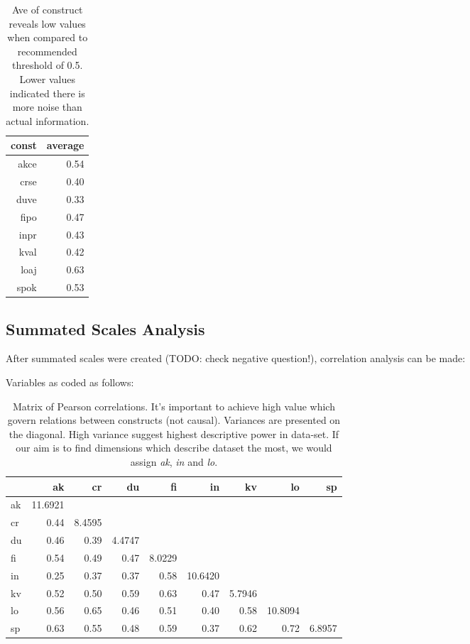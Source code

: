 \documentclass[10pt,a4paper]{article}
\begin{document}
\begin{table}[ht]
\centering
\caption{Ave of construct reveals low values when compared to recommended threshold of 0.5. Lower values indicated there is more noise than actual information.}

\begin{tabular}{rr}
  \hline
 const & average \\  \hline
 akce & 0.54 \\ 
 crse & 0.40 \\ 
 duve & 0.33 \\ 
 fipo & 0.47 \\ 
 inpr & 0.43 \\ 
 kval & 0.42 \\ 
 loaj & 0.63 \\ 
 spok & 0.53 \\ 
   \hline
\end{tabular}
\label{t:ave_const}
\end{table}

\subsection{Summated Scales Analysis}
After summated scales were created (TODO: check negative question!), correlation analysis can be made:
\begin{table}[htb!]
\centering
\caption{Matrix of Pearson correlations. It's important to achieve high value which govern relations between constructs (not causal). Variances are presented on the diagonal. High variance suggest highest descriptive power in data-set. If our aim is to find dimensions which describe dataset the most, we would assign \emph{ak}, \emph{in} and \emph{lo}. } Variables as coded as follows:
\begin{tabular}{l	rrrrrrrr}
  \hline
 & ak & cr & du & fi & in & kv & lo & sp \\ \hline
  ak & 11.6921 &  &  &  &  &  &  &  \\ 
  cr & 0.44 & 8.4595 &  &  &  & &  &  \\ 
  du & 0.46 & 0.39 & 4.4747 &  &  &  &  &  \\ 
  fi & 0.54 & 0.49 & 0.47 & 8.0229 &  &  &  &  \\ 
  in & 0.25 & 0.37 & 0.37 & 0.58 & 10.6420 &  &  &  \\ 
  kv & 0.52 & 0.50 & 0.59 & 0.63 & 0.47 & 5.7946 &  &  \\ 
  lo & 0.56 & 0.65 & 0.46 & 0.51 & 0.40 & 0.58 & 10.8094 &  \\ 
  sp & 0.63 & 0.55 & 0.48 & 0.59 & 0.37 & 0.62 & 0.72 & 6.8957 \\ 
   \hline
\end{tabular}
\end{table}
\end{document}
